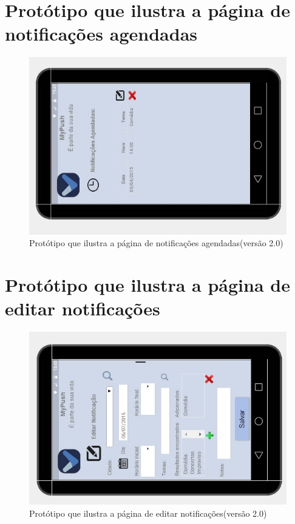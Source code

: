 \begin{apendicesenv}
    \pagebreak
      \section*{Protótipo que ilustra a página de notificações agendadas}

    \begin{figure}[!htbp]
      \centering
      \includegraphics[scale=0.9, angle=-90]{editaveis/figuras/prototipo_alta_fidelidade_v2/2_7}
      \caption{Protótipo que ilustra a página de notificações agendadas(versão 2.0)}
      \label{v2}
    \end{figure}
    
    \pagebreak
      \section*{Protótipo que ilustra a página de editar notificações}

    \begin{figure}[!htbp]
      \centering
      \includegraphics[scale=0.9, angle=-90]{editaveis/figuras/prototipo_alta_fidelidade_v2/2_8}
      \caption{Protótipo que ilustra a página de editar notificações(versão 2.0)}
      \label{v2}
    \end{figure}
    

\end{apendicesenv}
